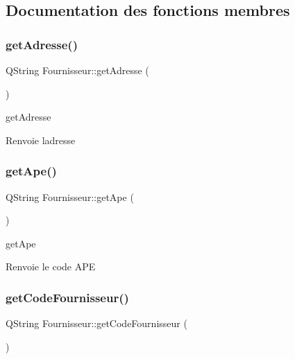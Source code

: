 \subsection{Documentation des fonctions membres}
\mbox{\label{class_fournisseur_a8f14d2c643575cc8bc7ce836d5bfe9bf}} 
\subsubsection{\texorpdfstring{get\+Adresse()}{getAdresse()}}
{\footnotesize\ttfamily Q\+String Fournisseur\+::get\+Adresse (\begin{DoxyParamCaption}{ }\end{DoxyParamCaption})}



get\+Adresse 

\begin{DoxyReturn}{Renvoie}
l\textquotesingle{}adresse 
\end{DoxyReturn}
\mbox{\label{class_fournisseur_aa85152c3305393fe49ba6a1480fcfea0}} 
\subsubsection{\texorpdfstring{get\+Ape()}{getApe()}}
{\footnotesize\ttfamily Q\+String Fournisseur\+::get\+Ape (\begin{DoxyParamCaption}{ }\end{DoxyParamCaption})}



get\+Ape 

\begin{DoxyReturn}{Renvoie}
le code A\+PE 
\end{DoxyReturn}
\mbox{\label{class_fournisseur_a4ade53722bfbacf27e48f656ac74c6ee}} 
\subsubsection{\texorpdfstring{get\+Code\+Fournisseur()}{getCodeFournisseur()}}
{\footnotesize\ttfamily Q\+String Fournisseur\+::get\+Code\+Fournisseur (\begin{DoxyParamCaption}{ }\end{DoxyParamCaption})}



